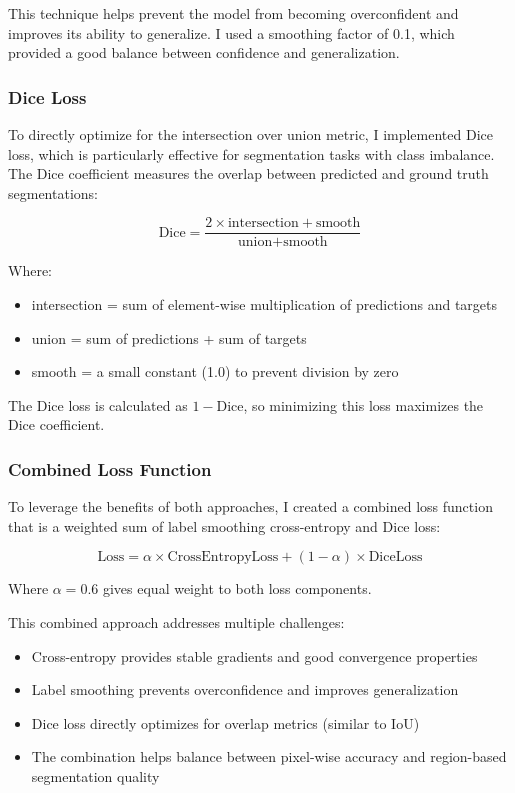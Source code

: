 \documentclass[]{article}
\begin{document}
This technique helps prevent the model from becoming overconfident and improves its ability to generalize. I used a smoothing factor of 0.1, which provided a good balance between confidence and generalization.

\subsubsection{Dice Loss}
To directly optimize for the intersection over union metric, I implemented Dice loss, which is particularly effective for segmentation tasks with class imbalance. The Dice coefficient measures the overlap between predicted and ground truth segmentations:

\begin{equation}
\text{Dice} = \frac{2 \times \text{intersection} + \text{smooth}}{\text{union} + \text{smooth}}
\end{equation}

Where:
\begin{itemize}
    \item intersection = sum of element-wise multiplication of predictions and targets
    \item union = sum of predictions + sum of targets
    \item smooth = a small constant (1.0) to prevent division by zero
\end{itemize}

The Dice loss is calculated as $1 - \text{Dice}$, so minimizing this loss maximizes the Dice coefficient.

\subsubsection{Combined Loss Function}
To leverage the benefits of both approaches, I created a combined loss function that is a weighted sum of label smoothing cross-entropy and Dice loss:

\begin{equation}
\text{Loss} = \alpha \times \text{CrossEntropyLoss} + (1-\alpha) \times \text{DiceLoss}
\end{equation}

Where $\alpha = 0.6$ gives equal weight to both loss components.

This combined approach addresses multiple challenges:
\begin{itemize}
    \item Cross-entropy provides stable gradients and good convergence properties
    \item Label smoothing prevents overconfidence and improves generalization
    \item Dice loss directly optimizes for overlap metrics (similar to IoU)
    \item The combination helps balance between pixel-wise accuracy and region-based segmentation quality
\end{itemize}
\end{document}
